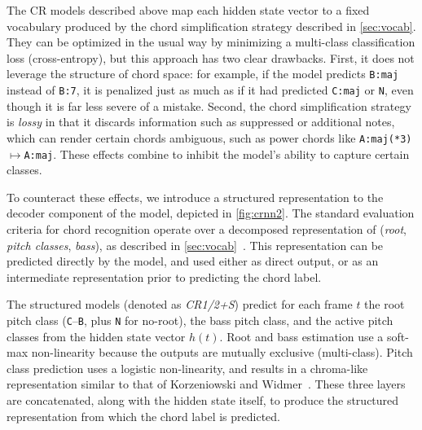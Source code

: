\documentclass{article}
\begin{document}
The CR models described above map each hidden state vector to a fixed vocabulary produced by the chord simplification strategy described in \cref{sec:vocab}.
They can be optimized in the usual way by minimizing a multi-class classification loss (cross-entropy), but this approach has two clear drawbacks.
First, it does not leverage the structure of chord space: for example, if the model predicts \texttt{B:maj} instead of \texttt{B:7}, it is penalized just as much as if it had predicted \texttt{C:maj} or \texttt{N}, even though it is far less severe of a mistake.
Second, the chord simplification strategy is \emph{lossy} in that it discards information such as suppressed or additional notes, which can render certain chords ambiguous, such as power chords like \texttt{A:maj(*3)}$\mapsto$\texttt{A:maj}.
These effects combine to inhibit the model's ability to capture certain classes.

To counteract these effects, we introduce a structured representation to the decoder component of the model, depicted in \cref{fig:crnn2}.
The standard evaluation criteria for chord recognition operate over a decomposed representation of (\emph{root}, \emph{pitch classes}, \emph{bass}), as described in \cref{sec:vocab}~\cite{raffel2014mir_eval}.
This representation can be predicted directly by the model, and used either as direct output, or as an intermediate representation prior to predicting the chord label.


The structured models (denoted as \emph{CR1/2+S}) predict for each frame $t$ the root pitch class (\texttt{C}--\texttt{B}, plus \texttt{N} for no-root), the bass pitch class, and the active pitch classes from the hidden state vector $h(t)$.
Root and bass estimation use a soft-max non-linearity because the outputs are mutually exclusive (multi-class).
Pitch class prediction uses a logistic non-linearity, and results in a chroma-like representation similar to that of Korzeniowski and Widmer~\cite{korzeniowski2016feature}.
These three layers are concatenated, along with the hidden state itself, to produce the structured representation from which the chord label is predicted.
\end{document}
